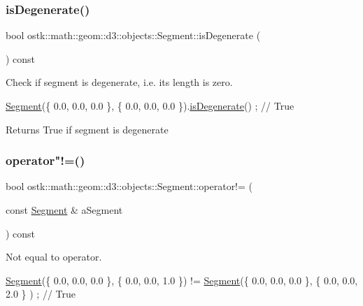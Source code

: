 \subsubsection{\texorpdfstring{is\+Degenerate()}{isDegenerate()}}
{\footnotesize\ttfamily bool ostk\+::math\+::geom\+::d3\+::objects\+::\+Segment\+::is\+Degenerate (\begin{DoxyParamCaption}{ }\end{DoxyParamCaption}) const}



Check if segment is degenerate, i.\+e. its length is zero. 


\begin{DoxyCode}
\hyperlink{classostk_1_1math_1_1geom_1_1d3_1_1objects_1_1_segment_aa2cb60ce06335a5f76120c658219494c}{Segment}(\{ 0.0, 0.0, 0.0 \}, \{ 0.0, 0.0, 0.0 \}).\hyperlink{classostk_1_1math_1_1geom_1_1d3_1_1objects_1_1_segment_a472767f407b4fa42ae6de7d48ccb60d0}{isDegenerate}() ; \textcolor{comment}{// True}
\end{DoxyCode}


\begin{DoxyReturn}{Returns}
True if segment is degenerate 
\end{DoxyReturn}
\mbox{\label{classostk_1_1math_1_1geom_1_1d3_1_1objects_1_1_segment_a2239bed274a65f4e0f25147c15f343c7}} 
\subsubsection{\texorpdfstring{operator"!=()}{operator!=()}}
{\footnotesize\ttfamily bool ostk\+::math\+::geom\+::d3\+::objects\+::\+Segment\+::operator!= (\begin{DoxyParamCaption}\item[{const \hyperlink{classostk_1_1math_1_1geom_1_1d3_1_1objects_1_1_segment}{Segment} \&}]{a\+Segment }\end{DoxyParamCaption}) const}



Not equal to operator. 


\begin{DoxyCode}
\hyperlink{classostk_1_1math_1_1geom_1_1d3_1_1objects_1_1_segment_aa2cb60ce06335a5f76120c658219494c}{Segment}(\{ 0.0, 0.0, 0.0 \}, \{ 0.0, 0.0, 1.0 \}) != \hyperlink{classostk_1_1math_1_1geom_1_1d3_1_1objects_1_1_segment_aa2cb60ce06335a5f76120c658219494c}{Segment}(\{ 0.0, 0.0, 0.0 \}, \{ 0.0, 0.0, 2.0 \}
      ) ; \textcolor{comment}{// True}
\end{DoxyCode}



